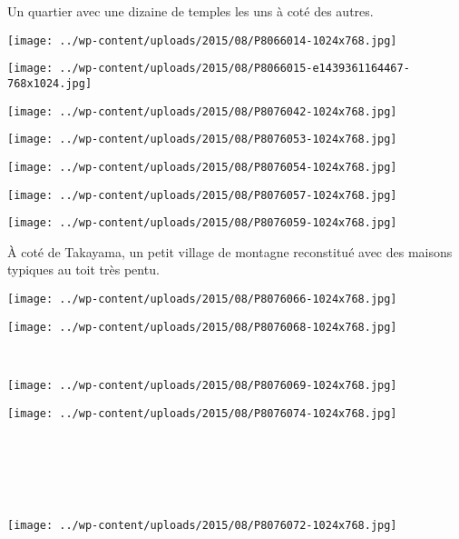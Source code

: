   Un quartier avec une dizaine de temples les uns à coté des autres. 
\begin{center} \texttt{[image: ../wp-content/uploads/2015/08/P8066014-1024x768.jpg]} \end{center}
\begin{center} \texttt{[image: ../wp-content/uploads/2015/08/P8066015-e1439361164467-768x1024.jpg]} \end{center}
\begin{center} \texttt{[image: ../wp-content/uploads/2015/08/P8076042-1024x768.jpg]} \end{center}
\begin{center} \texttt{[image: ../wp-content/uploads/2015/08/P8076053-1024x768.jpg]} \end{center}
\begin{center} \texttt{[image: ../wp-content/uploads/2015/08/P8076054-1024x768.jpg]} \end{center}
\begin{center} \texttt{[image: ../wp-content/uploads/2015/08/P8076057-1024x768.jpg]} \end{center}
\vfill
\begin{center} \texttt{[image: ../wp-content/uploads/2015/08/P8076059-1024x768.jpg]} \end{center}
\vspace{-\topsep}
\vspace{-0.75mm}
\pagebreak

 \`A coté de Takayama, un petit village de montagne reconstitué avec des maisons typiques au toit très pentu. 
\begin{center} \texttt{[image: ../wp-content/uploads/2015/08/P8076066-1024x768.jpg]} \end{center}
\begin{center} \texttt{[image: ../wp-content/uploads/2015/08/P8076068-1024x768.jpg]} \end{center}
\vspace{-\topsep}
\vspace{-2.75mm}
\pagebreak
~\\
\begin{center} \texttt{[image: ../wp-content/uploads/2015/08/P8076069-1024x768.jpg]} \end{center}
\begin{center} \texttt{[image: ../wp-content/uploads/2015/08/P8076074-1024x768.jpg]} \end{center}
\vspace{-\topsep}
\vspace{-2.75mm}
\pagebreak
~\\~\\~\\~\\
\begin{center} \texttt{[image: ../wp-content/uploads/2015/08/P8076072-1024x768.jpg]} \end{center}

